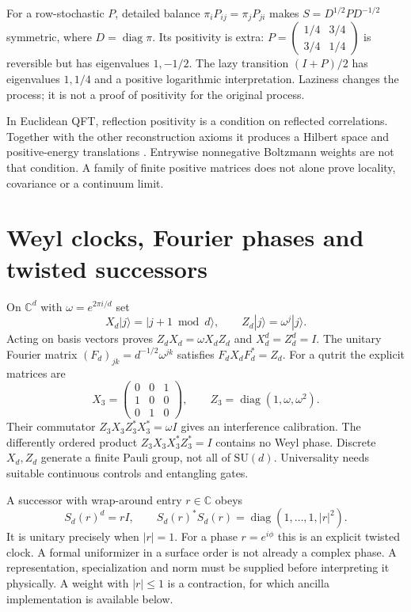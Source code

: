 \documentclass[11pt,oneside,openany]{book}
\theoremstyle{definition}\newtheorem{definition}[theorem]{Definition}
\theoremstyle{remark}\newtheorem{remark}[theorem]{Remark}
\newcommand{\C}{\mathbb C}\newcommand{\Z}{\mathbb Z}\newcommand{\R}{\mathbb R}
\begin{document}
For a row-stochastic $P$, detailed balance
$\pi_iP_{ij}=\pi_jP_{ji}$ makes
$S=D^{1/2}PD^{-1/2}$ symmetric, where $D=\operatorname{diag}\pi$.
Its positivity is extra: $P=\left(\begin{smallmatrix}1/4&3/4\\3/4&1/4
\end{smallmatrix}\right)$ is reversible but has eigenvalues $1,-1/2$.
The lazy transition $(I+P)/2$ has eigenvalues $1,1/4$ and a positive
logarithmic interpretation. Laziness changes the process; it is not a
proof of positivity for the original process.

In Euclidean QFT, reflection positivity is a condition on reflected
correlations. Together with the other reconstruction axioms it produces a
Hilbert space and positive-energy translations
\cite{PhysOsterwalderSchrader}. Entrywise nonnegative Boltzmann weights are
not that condition. A family of finite positive matrices does not alone
prove locality, covariance or a continuum limit.

\section{Weyl clocks, Fourier phases and twisted successors}
On $\C^d$ with $\omega=e^{2\pi i/d}$ set
\[
 X_d|j\rangle=|j+1\bmod d\rangle,\qquad
 Z_d|j\rangle=\omega^j|j\rangle.
\]
Acting on basis vectors proves $Z_dX_d=\omega X_dZ_d$ and
$X_d^d=Z_d^d=I$. The unitary Fourier matrix
$(F_d)_{jk}=d^{-1/2}\omega^{jk}$ satisfies $F_dX_dF_d^*=Z_d$.
For a qutrit the explicit matrices are
\[
 X_3=\begin{pmatrix}0&0&1\\1&0&0\\0&1&0\end{pmatrix},\qquad
 Z_3=\operatorname{diag}(1,\omega,\omega^2).
\]
Their commutator $Z_3X_3Z_3^*X_3^*=\omega I$ gives an interference
calibration. The differently ordered product $Z_3X_3X_3^*Z_3^*=I$
contains no Weyl phase. Discrete $X_d,Z_d$ generate a finite Pauli group,
not all of $\mathrm{SU}(d)$. Universality needs suitable continuous
controls and entangling gates.

A successor with wrap-around entry $r\in\C$ obeys
\[
 S_d(r)^d=rI,\qquad
 S_d(r)^*S_d(r)=\operatorname{diag}(1,\ldots,1,|r|^2).
\]
It is unitary precisely when $|r|=1$. For a phase $r=e^{i\phi}$ this is
an explicit twisted clock. A formal uniformizer in a surface order is not
already a complex phase. A representation, specialization and norm must
be supplied before interpreting it physically. A weight with $|r|\le1$
is a contraction, for which ancilla implementation is available below.
\end{document}
